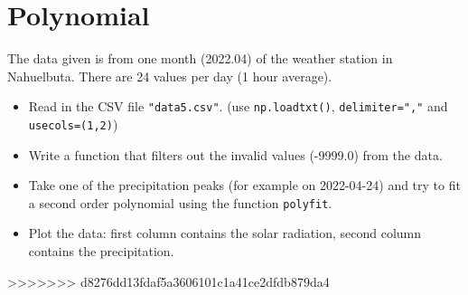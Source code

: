 \section{Polynomial}

The data given is from one month (2022.04) of the weather station in Nahuelbuta.
There are 24 values per day (1 hour average).

\begin{itemize}
    \item Read in the CSV file \verb|"data5.csv"|. (use \verb|np.loadtxt()|, \verb|delimiter=","| and \verb|usecols=(1,2)|)
    \item Write a function that filters out the invalid values (-9999.0) from the data.
    \item Take one of the precipitation peaks (for example on 2022-04-24) and try to fit a second order polynomial using the function \verb|polyfit|.
    \item Plot the data: first column contains the solar radiation, second column contains the precipitation.
\end{itemize}
>>>>>>> d8276dd13fdaf5a3606101c1a41ce2dfdb879da4
